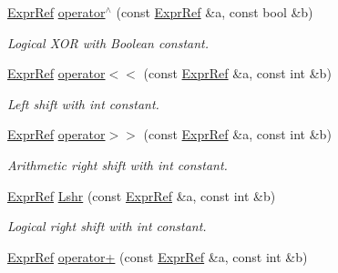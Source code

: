 \begin{DoxyCompactItemize}
\mbox{\label{namespaceilang_a8bd4e16eacbe789ffa001734f64c4247}} 
\mbox{\hyperlink{classilang_1_1_expr_ref}{Expr\+Ref}} \mbox{\hyperlink{namespaceilang_a8bd4e16eacbe789ffa001734f64c4247}{operator$^\wedge$}} (const \mbox{\hyperlink{classilang_1_1_expr_ref}{Expr\+Ref}} \&a, const bool \&b)
\begin{DoxyCompactList}\small\item\em Logical X\+OR with Boolean constant. \end{DoxyCompactList}\item 
\mbox{\label{namespaceilang_a9ce724b1e6f1d4fe10e8b4749df344f1}} 
\mbox{\hyperlink{classilang_1_1_expr_ref}{Expr\+Ref}} \mbox{\hyperlink{namespaceilang_a9ce724b1e6f1d4fe10e8b4749df344f1}{operator$<$$<$}} (const \mbox{\hyperlink{classilang_1_1_expr_ref}{Expr\+Ref}} \&a, const int \&b)
\begin{DoxyCompactList}\small\item\em Left shift with int constant. \end{DoxyCompactList}\item 
\mbox{\label{namespaceilang_a0bb1919952d428702d64090f2ea81fa8}} 
\mbox{\hyperlink{classilang_1_1_expr_ref}{Expr\+Ref}} \mbox{\hyperlink{namespaceilang_a0bb1919952d428702d64090f2ea81fa8}{operator$>$$>$}} (const \mbox{\hyperlink{classilang_1_1_expr_ref}{Expr\+Ref}} \&a, const int \&b)
\begin{DoxyCompactList}\small\item\em Arithmetic right shift with int constant. \end{DoxyCompactList}\item 
\mbox{\label{namespaceilang_ad75467ae3bda2dbdcec1e140dada8e41}} 
\mbox{\hyperlink{classilang_1_1_expr_ref}{Expr\+Ref}} \mbox{\hyperlink{namespaceilang_ad75467ae3bda2dbdcec1e140dada8e41}{Lshr}} (const \mbox{\hyperlink{classilang_1_1_expr_ref}{Expr\+Ref}} \&a, const int \&b)
\begin{DoxyCompactList}\small\item\em Logical right shift with int constant. \end{DoxyCompactList}\item 
\mbox{\label{namespaceilang_a21aaed36c9ccdb21be25f46d8350430b}} 
\mbox{\hyperlink{classilang_1_1_expr_ref}{Expr\+Ref}} \mbox{\hyperlink{namespaceilang_a21aaed36c9ccdb21be25f46d8350430b}{operator+}} (const \mbox{\hyperlink{classilang_1_1_expr_ref}{Expr\+Ref}} \&a, const int \&b)

\end{DoxyCompactItemize}
